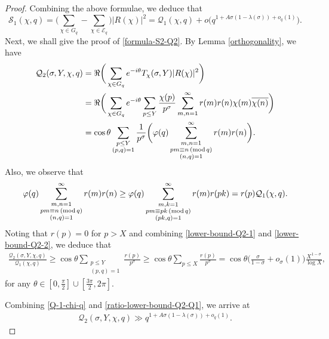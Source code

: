 \documentclass[12pt]{amsart}
\numberwithin{equation}{section}
\theoremstyle{plain}
\theoremstyle{remark}
\theoremstyle{definition}
\theoremstyle{remark}
\renewcommand{\mod}[1]{\,({\rm mod}\,#1)}
\begin{document}
\begin{proof}
Combining the above formulae, we deduce that
\[
\mathcal{S}_1(\chi,q)=\bigg(\sum_{\chi\in G_q}-\sum_{\chi\in\mathcal{E}_q}\bigg)|R(\chi)|^2
=\mathcal{Q}_1(\chi,q)+o\big(q^{1+A\sigma(1-\lambda(\sigma))+o_q(1)}\big).
\]
Next, we shall give the proof of \eqref{formula-S2-Q2}. By Lemma \ref{orthogonality}, we have
\begin{equation}\label{lower-bound-Q2-1}
\begin{aligned}
\mathcal{Q}_2(\sigma,Y,\chi,q)&=\Re\bigg(\sum_{\chi\in G_q}e^{-i\theta}T_{\chi}(\sigma,Y)|R(\chi)|^2\bigg)\\
&=\Re\bigg(\sum_{\chi\in G_q}e^{-i\theta}\sum_{p\leq Y}\frac{\chi(p)}{p^{\sigma}}
\sum_{m,n=1}^{\infty}r(m)r(n)\chi(m)\overline{\chi(n)}\bigg)\\
&=\cos\theta\sum_{\substack{p\leq Y\\(p,q)=1}}\frac{1}{p^{\sigma}}
\bigg(\varphi(q)\sum_{\substack{m,n=1\\pm\equiv n\mod q\\(n,q)=1}}^{\infty}r(m)r(n)\bigg).
\end{aligned}
\end{equation}
Also, we observe that
\begin{equation}\label{lower-bound-Q2-2}
\begin{aligned}
\varphi(q)\sum_{\substack{m,n=1\\pm\equiv n\mod q\\(n,q)=1}}^{\infty}r(m)r(n)
\geq\varphi(q)\sum_{\substack{m,k=1\\pm\equiv pk\mod q\\(pk,q)=1}}^{\infty}r(m)r(pk)
= r(p)\mathcal{Q}_1(\chi,q).
\end{aligned}
\end{equation}
Noting that $r(p)=0$ for $p>X$ and combining \eqref{lower-bound-Q2-1} and \eqref{lower-bound-Q2-2}, we deduce that
\begin{equation}\label{ratio-lower-bound-Q2-Q1}
\begin{aligned}
\frac{\mathcal{Q}_2(\sigma,Y,\chi,q)}{\mathcal{Q}_1(\chi,q)}\geq\cos\theta\sum_{\substack{p\leq Y \\ (p,q)=1}}\frac{r(p)}{p^{\sigma}}
\geq\cos\theta\sum_{p\leq X}\frac{r(p)}{p^{\sigma}}
=\cos\theta\bigg(\frac{\sigma}{1-\sigma}+o_{\sigma}(1)\bigg)\frac{X^{1-\sigma}}{\log X},
\end{aligned}
\end{equation}
for any $\theta\in[0,\frac{\pi}{2}]\cup[\frac{3\pi}{2},2\pi]$.

Combining \eqref{Q-1-chi-q} and \eqref{ratio-lower-bound-Q2-Q1}, we arrive at
\begin{equation}\label{final-ratio-lower-bound-Q2-Q1}
\begin{aligned}
\mathcal{Q}_2(\sigma,Y,\chi,q)\gg q^{1+A\sigma(1-\lambda(\sigma))+o_q(1)}.
\end{aligned}
\end{equation}



\end{proof}
\end{document}
